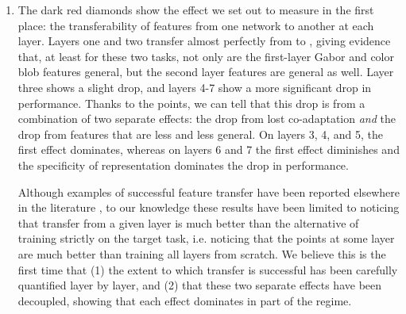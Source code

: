 \begin{enumerate}[leftmargin=1.5em]
\item The dark red  diamonds show the effect we set out to measure in the first place: the transferability of features from one network to another at each layer. Layers one and two transfer almost perfectly from  to  , giving evidence that, at least for these two tasks, not only are the first-layer Gabor and color blob features general, but the second layer features are general as well. Layer three shows a slight drop, and layers 4-7 show a more significant drop in performance. Thanks to the  points, we can tell that this drop is from a combination of two separate effects: the drop from lost co-adaptation \emph{and} the drop from features that are less and less general. On layers 3, 4, and 5, the first effect dominates, whereas on layers 6 and 7 the first effect diminishes and the specificity of representation dominates the drop in performance.

Although examples of successful feature transfer have been reported elsewhere in the literature \citep{girshick2013rich-feature-hierarchies,donahue2013decaf:-a-deep-convolutional}, to our knowledge these results have been limited to noticing that transfer from a given layer is much better than the alternative of training strictly on the target task, i.e. noticing that the  points at some layer are much better than training all layers from scratch. We believe this is the first time that (1) the extent to which transfer is successful has been carefully quantified layer by layer, and (2) that these two separate effects have been decoupled, showing that each effect dominates in part of the regime.


\end{enumerate}
